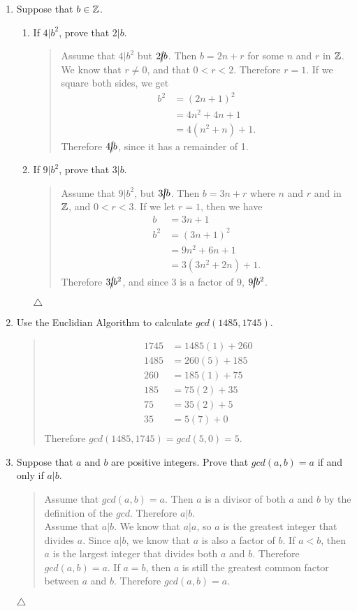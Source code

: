 \documentclass{hw}
\begin{document}
\begin{enumerate}
\item Suppose that $b\in\mathbb{Z}$.
\begin{enumerate}
\item If $4|b^{2}$, prove that $2|b$.
\begin{quote}
Assume that $4|b^{2}$ but $2\cancel{|}b$. Then $b = 2n + r$ for some $n$ and $r$ in $\mathbb{Z}$. We know
that $r\neq 0$, and that $0 < r < 2$. Therefore $r = 1$. If we square both sides, we get
\begin{align*}
b^{2} &= (2n+1)^{2}\\
&= 4n^{2}+4n+1\\
&= 4(n^{2} + n) + 1.
\end{align*}
Therefore $4\cancel{|}b$, since it has a remainder of 1.
\end{quote}
\item If $9|b^{2}$, prove that $3|b$.
\begin{quote}
Assume that $9|b^{2}$, but $3\cancel{|}b$. Then $b=3n+r$ where $n$ and $r$ and in $\mathbb{Z}$, and
$0 < r < 3$. If we let $r=1$, then we have
\begin{align*}
b &= 3n + 1\\
b^{2} &= (3n+1)^{2}\\
&= 9n^{2} + 6n + 1\\
&= 3(3n^{2} + 2n) + 1.
\end{align*}
Therefore $3\cancel{|}b^{2}$, and since 3 is a factor of 9, $9\cancel{|}b^{2}$.
\end{quote}
$\triangle$
\end{enumerate}

\item Use the Euclidian Algorithm to calculate $gcd(1485,1745)$.
\begin{quote}
\begin{align*}
1745 &= 1485(1) + 260\\
1485 &= 260(5) + 185\\
260 &= 185(1) + 75\\
185 &= 75(2) + 35\\
75 &= 35(2) + 5\\
35 &= 5(7) + 0\\
\end{align*}
Therefore $gcd(1485,1745) = gcd(5,0) = 5$.
\end{quote}

\item Suppose that $a$ and $b$ are positive integers. Prove that $gcd(a,b) = a$ if and
only if $a|b$.
\begin{quote}
Assume that $gcd(a,b) = a$. Then $a$ is a divisor of both $a$ and $b$ by the definition of the $gcd$.
Therefore $a|b$.\\
Assume that $a|b$. We know that $a|a$, so $a$ is the greatest integer that divides $a$. Since $a|b$, we
know that $a$ is also a factor of $b$. If $a < b$, then $a$ is the largest integer that divides both $a$
and $b$. Therefore $gcd(a,b) = a$. If $a = b$, then $a$ is still the greatest common factor between
$a$ and $b$. Therefore $gcd(a,b) = a$.
\end{quote}
$\triangle$
\end{enumerate}
\end{document}

